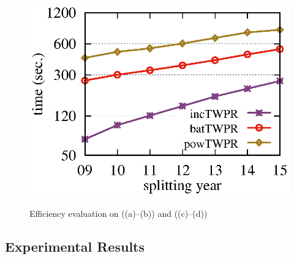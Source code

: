 \begin{figure}[tb!]
\begin{center}
{\includegraphics[scale=\graphscale]{./exp/MAG_time_twpr.eps}}
\hspace{0ex}
{}
\end{center}
\vspace{-1.5ex}
\caption{\small Efficiency evaluation on \aminer ((a)--(b)) and  \magdata ((c)--(d))}
\label{exp-time}
\vspace{-2ex}
\end{figure}

\subsection{Experimental Results}
\label{subsec-expres}

